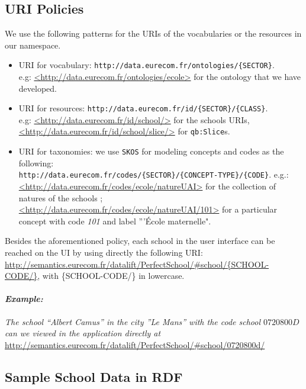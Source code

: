 \subsection{URI Policies}
We use the following patterns for the URIs of the vocabularies or the resources in our namespace.
\begin{itemize}
\item URI for vocabulary: \texttt{http://data.eurecom.fr/ontologies/\{SECTOR\}}. \\
e.g: \url{<http://data.eurecom.fr/ontologies/ecole>} for the ontology that we have developed.

\item URI for resources: \texttt{http://data.eurecom.fr/id/\{SECTOR\}/\{CLASS\}}. \\
e.g: \url{<http://data.eurecom.fr/id/school/>} for the schools URIs, \\
\url{<http://data.eurecom.fr/id/school/slice/>} for \texttt{qb:Slice}s.

\item URI for taxonomies: we use \texttt{SKOS} for modeling concepts and codes as the following: \\
\texttt{http://data.eurecom.fr/codes/\{SECTOR\}/\{CONCEPT-TYPE\}/\{CODE\}}. 
e.g.: \url{<http://data.eurecom.fr/codes/ecole/natureUAI>} for the collection of natures of the schools ; \\
        \url{<http://data.eurecom.fr/codes/ecole/natureUAI/101>} for a particular concept with code \textit{101} and label '''\'{E}cole maternelle".

\end{itemize}

Besides the aforementioned policy, each school in the user interface can be reached on the UI by using directly the following URI: 
 \url{http://semantics.eurecom.fr/datalift/PerfectSchool/\#school/{SCHOOL-CODE/}}, with \{SCHOOL-CODE/\} in lowercase. 
 
\paragraph{\textit{Example:}}
\textit{The school ``Albert Camus'' in the city ''Le Mans'' with the code school $0720800D$ can we viewed in the application directly at} \url{http://semantics.eurecom.fr/datalift/PerfectSchool/\#school/0720800d/}

\subsection{Sample School Data in RDF }

